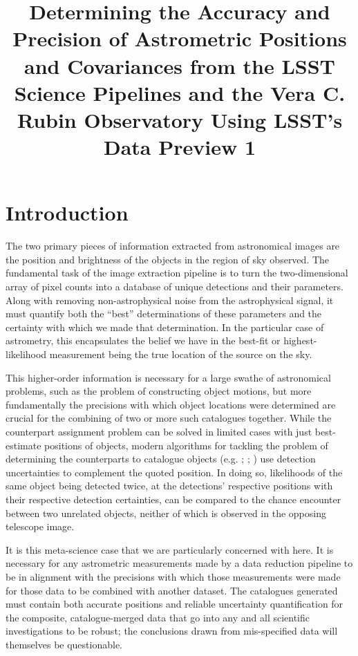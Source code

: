 \documentclass[SE,lsstdraft,authoryear,toc]{lsstdoc}
\title{Determining the Accuracy and Precision of Astrometric Positions and Covariances from the LSST Science Pipelines and the Vera C. Rubin Observatory Using LSST's Data Preview 1}
\date{\vcsDate}
\begin{document}
\maketitle


\section{Introduction}
The two primary pieces of information extracted from astronomical images are the position and brightness of the objects in the region of sky observed.
The fundamental task of the image extraction pipeline is to turn the two-dimensional array of pixel counts into a database of unique detections and their parameters.
Along with removing non-astrophysical noise from the astrophysical signal, it must quantify both the ``best'' determinations of these parameters and the certainty with which we made that determination.
In the particular case of astrometry, this encapsulates the belief we have in the best-fit or highest-likelihood measurement being the true location of the source on the sky.

This higher-order information is necessary for a large swathe of astronomical problems, such as the problem of constructing object motions, but more fundamentally the precisions with which object locations were determined are crucial for the combining of two or more such catalogues together.
While the counterpart assignment problem can be solved in limited cases with just best-estimate positions of objects, modern algorithms for tackling the problem of determining the counterparts to catalogue objects (e.g. \citealp{Budavari:2008aa}; \citealp{2018MNRAS.473.5570W}; \citealp{Pineau:2017aa}) use detection uncertainties to complement the quoted position.
In doing so, likelihoods of the same object being detected twice, at the detections' respective positions with their respective detection certainties, can be compared to the chance encounter between two unrelated objects, neither of which is observed in the opposing telescope image.

It is this meta-science case that we are particularly concerned with here.
It is necessary for any astrometric measurements made by a data reduction pipeline to be in alignment with the precisions with which those measurements were made for those data to be combined with another dataset.
The catalogues generated must contain both accurate positions and reliable uncertainty quantification for the composite, catalogue-merged data that go into any and all scientific investigations to be robust; the conclusions drawn from mis-specified data will themselves be questionable.
\end{document}
